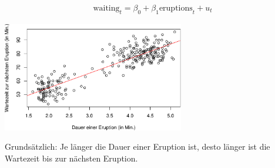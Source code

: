 \documentclass[12pt,a4paper]{article}
\newenvironment{Shaded}{\begin{snugshade}}{\end{snugshade}}
\newcommand{\AttributeTok}[1]{\textcolor[rgb]{0.13,0.29,0.53}{#1}}
\newcommand{\FunctionTok}[1]{\textcolor[rgb]{0.13,0.29,0.53}{\textbf{#1}}}
\newcommand{\NormalTok}[1]{#1}
\newcommand{\OtherTok}[1]{\textcolor[rgb]{0.56,0.35,0.01}{#1}}
\newcommand{\SpecialCharTok}[1]{\textcolor[rgb]{0.81,0.36,0.00}{\textbf{#1}}}
\newcommand{\StringTok}[1]{\textcolor[rgb]{0.31,0.60,0.02}{#1}}
\begin{document}
\begin{align*}
  \text{waiting}_t = \beta_0+\beta_1 \text{eruptions}_t + u_t 
\end{align*}

\begin{Shaded}
\end{Shaded}

\begin{center}\includegraphics[width=300px]{solution_3_files/figure-latex/unnamed-chunk-16-1} \end{center}

Grundsätzlich: Je länger die Dauer einer Eruption ist, desto länger ist
die Wartezeit bis zur nächsten Eruption.
\end{document}
